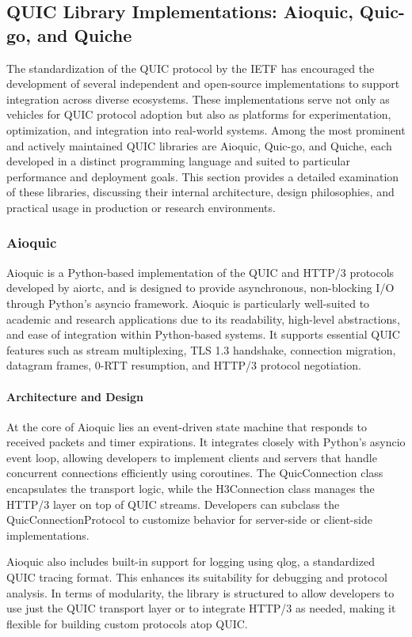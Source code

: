 \subsection{QUIC Library Implementations: Aioquic, Quic-go, and Quiche}
The standardization of the QUIC protocol by the IETF has encouraged the development of several independent and open-source implementations to support integration across diverse ecosystems. These implementations serve not only as vehicles for QUIC protocol adoption but also as platforms for experimentation, optimization, and integration into real-world systems. Among the most prominent and actively maintained QUIC libraries are Aioquic, Quic-go, and Quiche, each developed in a distinct programming language and suited to particular performance and deployment goals. This section provides a detailed examination of these libraries, discussing their internal architecture, design philosophies, and practical usage in production or research environments.

\subsubsection{Aioquic}
Aioquic is a Python-based implementation of the QUIC and HTTP/3 protocols developed by aiortc, and is designed to provide asynchronous, non-blocking I/O through Python's asyncio framework. Aioquic is particularly well-suited to academic and research applications due to its readability, high-level abstractions, and ease of integration within Python-based systems. It supports essential QUIC features such as stream multiplexing, TLS 1.3 handshake, connection migration, datagram frames, 0-RTT resumption, and HTTP/3 protocol negotiation.

\paragraph{Architecture and Design}
At the core of Aioquic lies an event-driven state machine that responds to received packets and timer expirations. It integrates closely with Python's asyncio event loop, allowing developers to implement clients and servers that handle concurrent connections efficiently using coroutines. The QuicConnection class encapsulates the transport logic, while the H3Connection class manages the HTTP/3 layer on top of QUIC streams. Developers can subclass the QuicConnectionProtocol to customize behavior for server-side or client-side implementations.

Aioquic also includes built-in support for logging using qlog, a standardized QUIC tracing format. This enhances its suitability for debugging and protocol analysis. In terms of modularity, the library is structured to allow developers to use just the QUIC transport layer or to integrate HTTP/3 as needed, making it flexible for building custom protocols atop QUIC.

